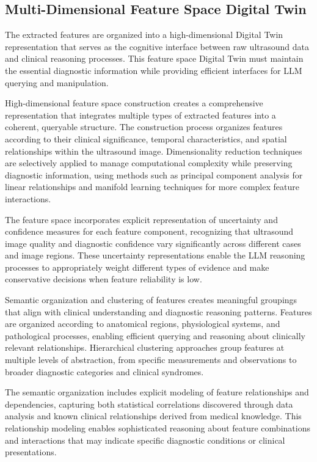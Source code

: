 \subsection{Multi-Dimensional Feature Space Digital Twin}

The extracted features are organized into a high-dimensional Digital Twin representation that serves as the cognitive interface between raw ultrasound data and clinical reasoning processes. This feature space Digital Twin must maintain the essential diagnostic information while providing efficient interfaces for LLM querying and manipulation.

High-dimensional feature space construction creates a comprehensive representation that integrates multiple types of extracted features into a coherent, queryable structure. The construction process organizes features according to their clinical significance, temporal characteristics, and spatial relationships within the ultrasound image. Dimensionality reduction techniques are selectively applied to manage computational complexity while preserving diagnostic information, using methods such as principal component analysis for linear relationships and manifold learning techniques for more complex feature interactions.

The feature space incorporates explicit representation of uncertainty and confidence measures for each feature component, recognizing that ultrasound image quality and diagnostic confidence vary significantly across different cases and image regions. These uncertainty representations enable the LLM reasoning processes to appropriately weight different types of evidence and make conservative decisions when feature reliability is low.

Semantic organization and clustering of features creates meaningful groupings that align with clinical understanding and diagnostic reasoning patterns. Features are organized according to anatomical regions, physiological systems, and pathological processes, enabling efficient querying and reasoning about clinically relevant relationships. Hierarchical clustering approaches group features at multiple levels of abstraction, from specific measurements and observations to broader diagnostic categories and clinical syndromes.

The semantic organization includes explicit modeling of feature relationships and dependencies, capturing both statistical correlations discovered through data analysis and known clinical relationships derived from medical knowledge. This relationship modeling enables sophisticated reasoning about feature combinations and interactions that may indicate specific diagnostic conditions or clinical presentations.


